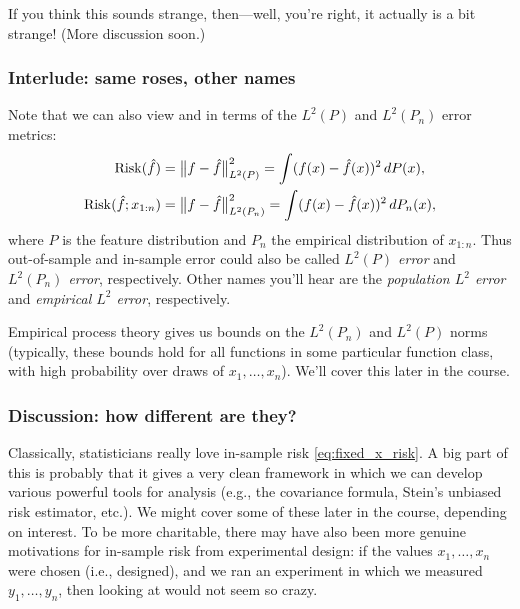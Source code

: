 \documentclass{article}
\begin{document}
If you think this sounds strange, then---well, you're right, it actually is a
bit strange! (More discussion soon.)

\subsubsection{Interlude: same roses, other names}

Note that we can also view \smash{$\Risk(\hf)$} and  in terms of the $L^2(P)$ and $L^2(P_n)$ error metrics:
\begin{align*}
\mathrm{Risk}(\hat{f}) &= \big\|f - \hat{f}\big\|_{L^2(P)}^2 
= \int (f(x) - \hat{f}(x))^2 \, dP(x), \\
\mathrm{Risk}(\hat{f}; x_{1:n}) &= \big\|f - \hat{f}\big\|_{L^2(P_n)}^2 
= \int (f(x) - \hat{f}(x))^2 \, dP_n(x),
\end{align*}
where $P$ is the feature distribution and $P_n$ the empirical distribution of
$x_{1:n}$. Thus out-of-sample and in-sample error could also be called 
\emph{$L^2(P)$ error} and \emph{$L^2(P_n)$ error}, respectively. Other names
you'll hear are the \emph{population $L^2$ error} and \emph{empirical $L^2$
  error}, respectively.    

Empirical process theory gives us bounds on the $L^2(P_n)$ and $L^2(P)$ norms
(typically, these bounds hold for all functions in some particular function
class, with high probability over draws of $x_1,\dots,x_n$). We'll cover this
later in the course.    

\subsubsection{Discussion: how different are they?}

Classically, statisticians really love in-sample risk \eqref{eq:fixed_x_risk}. A
big part of this is probably that it gives a very clean framework in which we
can develop various powerful tools for analysis (e.g., the covariance formula,
Stein's unbiased risk estimator, etc.). We might cover some of these later in
the course, depending on interest. To be more charitable, there may have also
been more genuine motivations for in-sample risk from experimental design: if
the values $x_1,\dots,x_n$ were chosen (i.e., designed), and we ran an
experiment in which we measured $y_1,\dots,y_n$, then looking at
 would not seem so crazy.  
\end{document}
